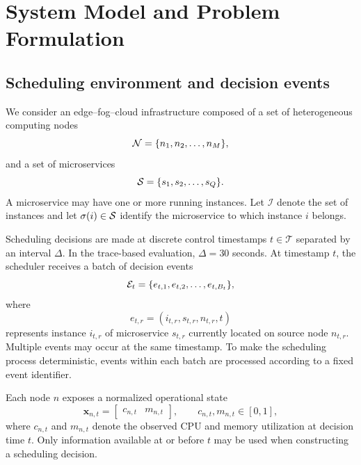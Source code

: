 \section{System Model and Problem Formulation}
\label{sec:model}

\subsection{Scheduling environment and decision events}

We consider an edge--fog--cloud infrastructure composed of a set of
heterogeneous computing nodes
\begin{equation}
    \mathcal{N}=\{n_1,n_2,\ldots,n_M\},
\end{equation}
and a set of microservices
\begin{equation}
    \mathcal{S}=\{s_1,s_2,\ldots,s_Q\}.
\end{equation}
A microservice may have one or more running instances. Let
$\mathcal{I}$ denote the set of instances and let
$\sigma(i)\in\mathcal{S}$ identify the microservice to which instance $i$
belongs.

Scheduling decisions are made at discrete control timestamps
$t\in\mathcal{T}$ separated by an interval $\Delta$. In the trace-based
evaluation, $\Delta=30$ seconds. At timestamp $t$, the scheduler receives
a batch of decision events
\begin{equation}
    \mathcal{E}_t=\{e_{t,1},e_{t,2},\ldots,e_{t,B_t}\},
\end{equation}
where
\begin{equation}
    e_{t,r}=(i_{t,r},s_{t,r},n_{t,r},t)
\end{equation}
represents instance $i_{t,r}$ of microservice $s_{t,r}$ currently
located on source node $n_{t,r}$. Multiple events may occur at the same
timestamp. To make the scheduling process deterministic, events within
each batch are processed according to a fixed event identifier.

Each node $n$ exposes a normalized operational state
\begin{equation}
\label{eq:node-state}
    \mathbf{x}_{n,t}
    =
    \begin{bmatrix}
        c_{n,t} & m_{n,t}
    \end{bmatrix},
    \qquad
    c_{n,t},m_{n,t}\in[0,1],
\end{equation}
where $c_{n,t}$ and $m_{n,t}$ denote the observed CPU and memory
utilization at decision time $t$. Only information available at or
before $t$ may be used when constructing a scheduling decision.

